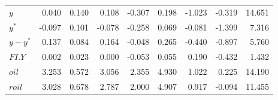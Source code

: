 \documentclass[10pt]{article}
\numberwithin{equation}{section}
\numberwithin{table}{section}
\numberwithin{figure}{section}
\begin{document}
\begin{spacing}{1.5}
\begin{tabularx}{\textwidth}{lrrrrrrrr}
$y$   & 0.040 & 0.140 & 0.108 & -0.307 & 0.198 & -1.023 & -0.319 & 14.651 \\
$y^*$ & -0.097 & 0.101 & -0.078 & -0.258 & 0.069 & -0.081 & -1.399 & 7.316 \\
$y-y^*$ & 0.137 & 0.084 & 0.164 & -0.048 & 0.265 & -0.440 & -0.897 & 5.760 \\
$FI.Y$ & 0.002 & 0.023 & 0.000 & -0.053 & 0.055 & 0.190 & -0.432 & 1.432 \\
$oil$ & 3.253 & 0.572 & 3.056 & 2.355 & 4.930 & 1.022 & 0.225 & 14.190 \\
$roil$ & 3.028 & 0.678 & 2.787 & 2.000 & 4.907 & 0.917 & -0.094 & 11.455 \\
\hline
\end{tabularx}
\vspace*{-0,6cm}\parnotes


\end{spacing}
\end{document}
